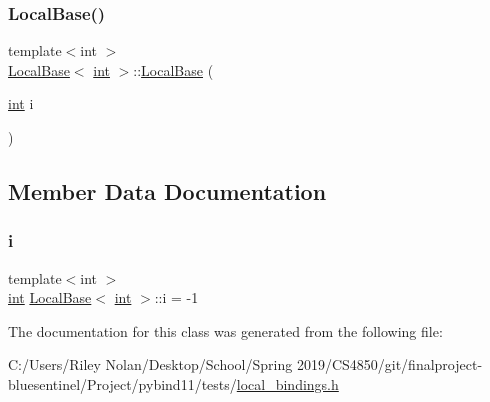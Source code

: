 \subsubsection{\texorpdfstring{LocalBase()}{LocalBase()}}
{\footnotesize\ttfamily template$<$int $>$ \\
\mbox{\hyperlink{class_local_base}{Local\+Base}}$<$ \mbox{\hyperlink{warnings_8h_a74f207b5aa4ba51c3a2ad59b219a423b}{int}} $>$\+::\mbox{\hyperlink{class_local_base}{Local\+Base}} (\begin{DoxyParamCaption}\item[{\mbox{\hyperlink{warnings_8h_a74f207b5aa4ba51c3a2ad59b219a423b}{int}}}]{i }\end{DoxyParamCaption})\hspace{0.3cm}{\ttfamily [inline]}}



\subsection{Member Data Documentation}
\mbox{\label{class_local_base_ad318186ada2bcc20ad8e483cee7b52d3}} 
\subsubsection{\texorpdfstring{i}{i}}
{\footnotesize\ttfamily template$<$int $>$ \\
\mbox{\hyperlink{warnings_8h_a74f207b5aa4ba51c3a2ad59b219a423b}{int}} \mbox{\hyperlink{class_local_base}{Local\+Base}}$<$ \mbox{\hyperlink{warnings_8h_a74f207b5aa4ba51c3a2ad59b219a423b}{int}} $>$\+::i = -\/1}



The documentation for this class was generated from the following file\+:\begin{DoxyCompactItemize}
\item 
C\+:/\+Users/\+Riley Nolan/\+Desktop/\+School/\+Spring 2019/\+C\+S4850/git/finalproject-\/bluesentinel/\+Project/pybind11/tests/\mbox{\hyperlink{local__bindings_8h}{local\+\_\+bindings.\+h}}\end{DoxyCompactItemize}

